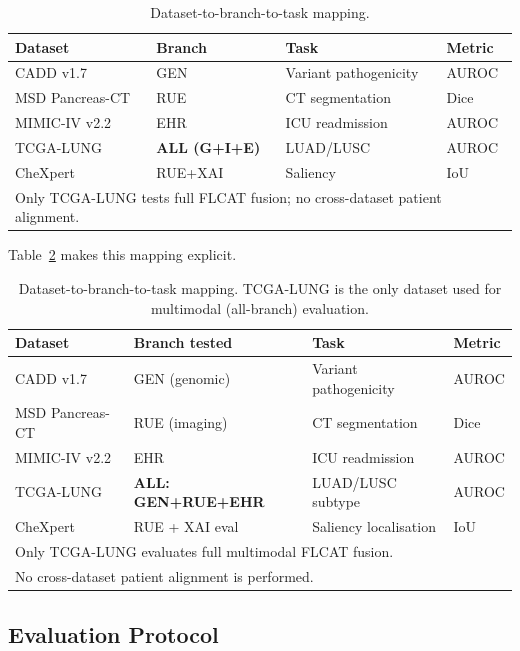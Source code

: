 \documentclass{ieeeaccess}
\begin{document}
\begin{table}[!h]
\caption{Dataset-to-branch-to-task mapping.}
\label{tab:dataset_task}
\centering\small\renewcommand{\arraystretch}{1.2}
\begin{tabular}{llll}
\toprule
\textbf{Dataset} & \textbf{Branch} & \textbf{Task} & \textbf{Metric}\\
\midrule
CADD v1.7 & GEN & Variant pathogenicity & AUROC\\
MSD Pancreas-CT & RUE & CT segmentation & Dice\\
MIMIC-IV v2.2 & EHR & ICU readmission & AUROC\\
TCGA-LUNG & \textbf{ALL (G+I+E)} & LUAD/LUSC & AUROC\\
CheXpert & RUE+XAI & Saliency & IoU\\
\bottomrule
\multicolumn{4}{l}{\footnotesize Only TCGA-LUNG tests full FLCAT fusion; no cross-dataset patient alignment.}\\
\end{tabular}
\end{table}

Table~\ref{tab:dataset_task} makes this mapping explicit.

\begin{table}[!h]
\caption{Dataset-to-branch-to-task mapping. TCGA-LUNG is the only
dataset used for multimodal (all-branch) evaluation.}
\label{tab:dataset_task}
\centering
\renewcommand{\arraystretch}{1.2}
\small
\begin{tabular}{llll}
\toprule
\textbf{Dataset} & \textbf{Branch tested} & \textbf{Task} & \textbf{Metric}\\
\midrule
CADD v1.7 & GEN (genomic) & Variant pathogenicity & AUROC\\
MSD Pancreas-CT & RUE (imaging) & CT segmentation & Dice\\
MIMIC-IV v2.2 & EHR & ICU readmission & AUROC\\
TCGA-LUNG & \textbf{ALL: GEN+RUE+EHR} & LUAD/LUSC subtype & AUROC\\
CheXpert & RUE + XAI eval & Saliency localisation & IoU\\
\bottomrule
\multicolumn{4}{l}{\footnotesize Only TCGA-LUNG evaluates full multimodal FLCAT fusion.}\\
\multicolumn{4}{l}{\footnotesize No cross-dataset patient alignment is performed.}\\
\end{tabular}
\end{table}


\subsection{Evaluation Protocol}
\end{document}
